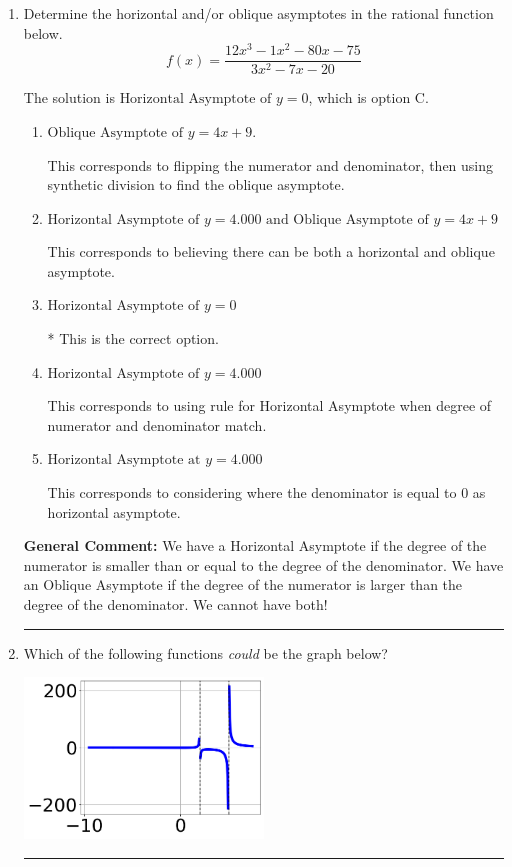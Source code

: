 \documentclass{extbook}[14pt]
\newcommand{\litem}[1]{\item #1

\rule{\textwidth}{0.4pt}}
\begin{document}
\begin{enumerate}\litem{
Determine the horizontal and/or oblique asymptotes in the rational function below.
\[ f(x) = \frac{12x^{3} -1 x^{2} -80 x -75}{3x^{2} -7 x -20} \]

The solution is \( \text{Horizontal Asymptote of } y = 0 \), which is option C.\begin{enumerate}[label=\Alph*.]
\item \( \text{Oblique Asymptote of } y = 4x + 9. \)

This corresponds to flipping the numerator and denominator, then using synthetic division to find the oblique asymptote.
\item \( \text{Horizontal Asymptote of } y = 4.000 \text{ and Oblique Asymptote of } y = 4x + 9 \)

This corresponds to believing there can be both a horizontal and oblique asymptote.
\item \( \text{Horizontal Asymptote of } y = 0 \)

* This is the correct option.
\item \( \text{Horizontal Asymptote of } y = 4.000  \)

This corresponds to using rule for Horizontal Asymptote when degree of numerator and denominator match.
\item \( \text{Horizontal Asymptote at } y = 4.000 \)

This corresponds to considering where the denominator is equal to 0 as horizontal asymptote.
\end{enumerate}

\textbf{General Comment:} We have a Horizontal Asymptote if the degree of the numerator is smaller than or equal to the degree of the denominator. We have an Oblique Asymptote if the degree of the numerator is larger than the degree of the denominator. We cannot have both!
}
\litem{
Which of the following functions \textit{could} be the graph below?

\begin{center}
    \includegraphics[width=0.5\textwidth]{../Figures/identifyGraphOfRationalFunctionCopyA.png}
\end{center}




}
\end{enumerate}
\end{document}
